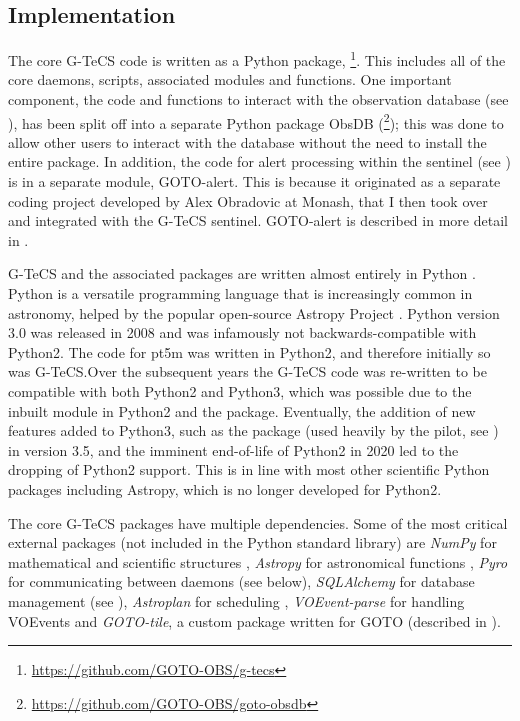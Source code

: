\begin{colsection}
\begin{colsection}
\end{colsection}


\subsection{Implementation}
\label{sec:implementation}
\begin{colsection}

The core G-TeCS code is written as a Python package, \footnote{\url{https://github.com/GOTO-OBS/g-tecs}}. This includes all of the core daemons, scripts, associated modules and functions. One important component, the code and functions to interact with the observation database (see ), has been split off into a separate Python package ObsDB (\footnote{\url{https://github.com/GOTO-OBS/goto-obsdb}}); this was done to allow other users to interact with the database without the need to install the entire  package. In addition, the code for alert processing within the sentinel (see ) is in a separate module, GOTO-alert. This is because it originated as a separate coding project developed by Alex Obradovic at Monash, that I then took over and integrated with the G-TeCS sentinel. GOTO-alert is described in more detail in .

G-TeCS and the associated packages are written almost entirely in Python \citep{Python}. Python is a versatile programming language that is increasingly common in astronomy, helped by the popular open-source Astropy Project \citep{astropy}. Python version 3.0 was released in 2008 and was infamously not backwards-compatible with Python2. The code for pt5m was written in Python2, and therefore initially so was G-TeCS.\@ Over the subsequent years the G-TeCS code was re-written to be compatible with both Python2 and Python3, which was possible due to the inbuilt  module in Python2 and the  package. Eventually, the addition of new features added to Python3, such as the  package (used heavily by the pilot, see ) in version 3.5, and the imminent end-of-life of Python2 in 2020 led to the dropping of Python2 support. This is in line with most other scientific Python packages including Astropy, which is no longer developed for Python2. %

The core G-TeCS packages have multiple dependencies. Some of the most critical external packages (not included in the Python standard library) are \emph{NumPy} for mathematical and scientific structures \citep{NumPy}, \emph{Astropy} for astronomical functions \citep{astropy}, \emph{Pyro} for communicating between daemons (see  below), \emph{SQLAlchemy} for database management (see ), \emph{Astroplan} for scheduling \citep[][see ]{astroplan}, \emph{VOEvent-parse} for handling VOEvents \citep[][see ]{voevent-parse} and \emph{GOTO-tile}, a custom package written for GOTO (described in ).


\end{colsection}
\end{colsection}
